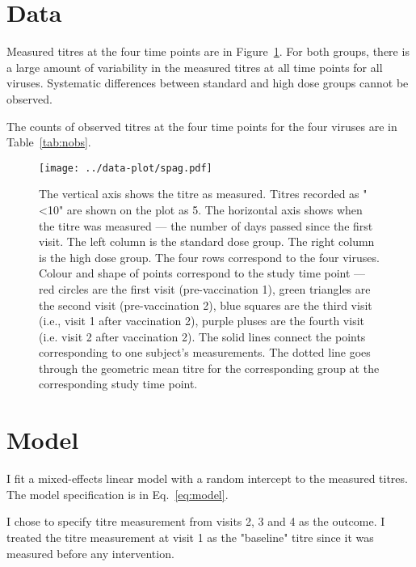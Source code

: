 \documentclass[11pt]{article}
\begin{document}
\section{Data}

Measured titres at the four time points are in Figure~\ref{fig:spag}.
For both groups, there is a large amount of variability in the measured titres
at all time points for all viruses. Systematic differences between standard and
high dose groups cannot be observed.

The counts of observed titres at the four time points for the four viruses are
in Table~\ref{tab:nobs}.



\begin{figure}[htp]
    \centering
    \texttt{[image: ../data-plot/spag.pdf]}
    \caption{
        The vertical axis shows the titre as measured.
        Titres recorded as "<10" are shown on the plot as 5.
        The horizontal axis shows when the titre was measured --- the number of
        days passed since the first visit.
        The left column is the standard dose group.
        The right column is the high dose group.
        The four rows correspond to the four viruses.
        Colour and shape of points correspond to the study time point ---
        red circles are the first visit (pre-vaccination 1),
        green triangles are the second visit (pre-vaccination 2),
        blue squares are the third visit (i.e., visit 1 after vaccination 2),
        purple pluses are the fourth visit (i.e. visit 2 after vaccination 2).
        The solid lines connect the points
        corresponding to one subject's measurements.
        The dotted line goes through the geometric mean titre for the
        corresponding group at the corresponding study time point.
    }
    \label{fig:spag}
\end{figure}

\section{Model}

I fit a mixed-effects linear model with a random intercept
to the measured titres.
The model specification is in Eq.~\ref{eq:model}.

I chose to specify titre measurement from visits 2, 3 and 4 as the outcome.
I treated the titre measurement at visit 1 as the "baseline" titre since
it was measured before any intervention.
\end{document}
